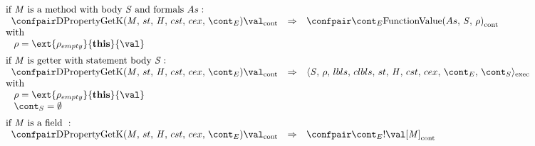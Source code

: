 \documentclass{article}
\begin{document}
\[
  \begin{array}{lcl@{\hspace{30mm}}}
	\textrm{if }\membermeta \textrm{ is a method with body }\stmt\textrm{ and formals }\formals :\\
	\hspace{2mm}
	\cesktrans{
		\contconf{\DPropertyGetK}{\val}}{
		\contconf{\econt}{\funval{\formals}{\stmt}{\env}}}\\
	\textrm{with}\\
	\hspace{3mm}
	\env = \ext{\env_{empty}}{\mathbf{this}}{\val}\\[2mm]

	\textrm{if }\membermeta \textrm{ is getter with statement body }\stmt :\\
	\hspace{2mm}
	\cesktrans{
		\contconf{\DPropertyGetK}{\val}}{
		\execconf{\stmt}{\env}{\lbls}{\clbls}{\handler}{\cstrace}{\cex}{\econt}{\scont}}
		\\
	\textrm{with}\\
	\hspace{3mm}
	\env = \ext{\env_{empty}}{\mathbf{this}}{\val}\\
	\hspace{3mm}
	\scont = \emptyset\\[2mm]

	\textrm{if }\membermeta \textrm{ is a field } :\\
	\hspace{2mm}\cesktrans{
		\contconf{\DPropertyGetK}{\val}}{
		\contconf{\econt}{\deref{\val[\membermeta]}}}\\
  \end{array}
\]
\end{document}
